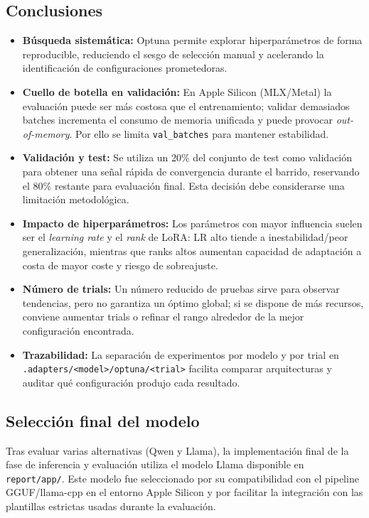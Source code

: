 \subsection{Conclusiones}

\begin{itemize}
    \item \textbf{Búsqueda sistemática:} Optuna permite explorar hiperparámetros de forma reproducible, reduciendo el sesgo de selección manual y acelerando la identificación de configuraciones prometedoras.
    \item \textbf{Cuello de botella en validación:} En Apple Silicon (MLX/Metal) la evaluación puede ser más costosa que el entrenamiento; validar demasiados batches incrementa el consumo de memoria unificada y puede provocar \textit{out-of-memory}. Por ello se limita \texttt{val\_batches} para mantener estabilidad.
    \item \textbf{Validación y test:} Se utiliza un 20\% del conjunto de test como validación para obtener una señal rápida de convergencia durante el barrido, reservando el 80\% restante para evaluación final. Esta decisión debe considerarse una limitación metodológica.
    \item \textbf{Impacto de hiperparámetros:} Los parámetros con mayor influencia suelen ser el \textit{learning rate} y el \textit{rank} de LoRA: LR alto tiende a inestabilidad/peor generalización, mientras que ranks altos aumentan capacidad de adaptación a costa de mayor coste y riesgo de sobreajuste.
    \item \textbf{Número de trials:} Un número reducido de pruebas sirve para observar tendencias, pero no garantiza un óptimo global; si se dispone de más recursos, conviene aumentar trials o refinar el rango alrededor de la mejor configuración encontrada.
    \item \textbf{Trazabilidad:} La separación de experimentos por modelo y por trial en \texttt{.adapters/<model>/optuna/<trial>} facilita comparar arquitecturas y auditar qué configuración produjo cada resultado.
\end{itemize}

\subsection{Selección final del modelo}

Tras evaluar varias alternativas (Qwen y Llama), la implementación final de la fase de inferencia y evaluación utiliza el modelo Llama disponible en \texttt{report/app/}. Este modelo fue seleccionado por su compatibilidad con el pipeline GGUF/llama-cpp en el entorno Apple Silicon y por facilitar la integración con las plantillas estrictas usadas durante la evaluación.
